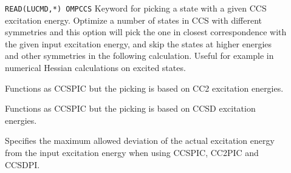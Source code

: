 \begin{description}
%
%
\item[] 

\verb|READ(LUCMD,*) OMPCCS| \newline
Keyword for picking a state with a given CCS excitation energy.
Optimize a number of states in CCS with different symmetries and this option
will pick the one in closest correspondence with the given input excitation
energy, and skip the states at higher energies and other symmetries in 
the following calculation.
Useful for example in numerical Hessian calculations on excited states.

\item[] 
Functions as CCSPIC but the picking is based on CC2 excitation energies.
\item[] 
Functions as CCSPIC but the picking is based on CCSD excitation energies.
%
\item[] 
Specifies the maximum allowed deviation of the actual excitation energy
from the input excitation energy when using CCSPIC, CC2PIC and CCSDPI. 

\end{description}
